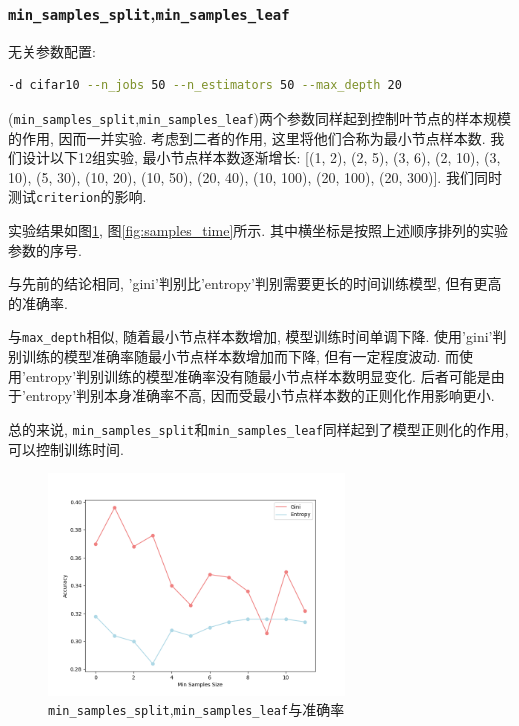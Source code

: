 \documentclass[a4paper]{article}
\begin{document}
\subsubsection{\texttt{min\_samples\_split},\texttt{min\_samples\_leaf}}
无关参数配置:
 \begin{lstlisting}[language=bash]
-d cifar10 --n_jobs 50 --n_estimators 50 --max_depth 20
\end{lstlisting}

(\texttt{min\_samples\_split},\texttt{min\_samples\_leaf})两个参数同样起到控制叶节点的样本规模的作用,  因而一并实验. 考虑到二者的作用, 这里将他们合称为最小节点样本数.
我们设计以下12组实验, 最小节点样本数逐渐增长: [(1, 2), (2, 5), (3, 6), (2, 10), (3, 10), (5, 30), (10, 20), (10, 50), (20, 40), (10, 100), (20, 100), (20, 300)]. 我们同时测试\texttt{criterion}的影响.

实验结果如图\ref{fig:samples_acc}, 图\ref{fig:samples_time}所示. 其中横坐标是按照上述顺序排列的实验参数的序号.

与先前的结论相同, 'gini'判别比'entropy'判别需要更长的时间训练模型, 但有更高的准确率.

与\texttt{max\_depth}相似, 随着最小节点样本数增加, 模型训练时间单调下降. 使用'gini'判别训练的模型准确率随最小节点样本数增加而下降,  但有一定程度波动. 而使用'entropy'判别训练的模型准确率没有随最小节点样本数明显变化. 后者可能是由于'entropy'判别本身准确率不高, 因而受最小节点样本数的正则化作用影响更小.

总的来说, \texttt{min\_samples\_split}和\texttt{min\_samples\_leaf}同样起到了模型正则化的作用, 可以控制训练时间.
\begin{figure}[h]
    \centering
    \includegraphics[width=0.7\textwidth,height=0.4\textwidth]{figs/3.png}
    
    \caption{\texttt{min\_samples\_split},\texttt{min\_samples\_leaf}与准确率}
    \label{fig:samples_acc}
\end{figure}
\end{document}
